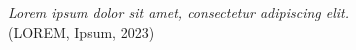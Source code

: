 
\renewcommand{\epigraphname}{EPÍGRAFE}

\begin{epigrafe}

\textit{Lorem ipsum dolor sit amet, consectetur adipiscing elit.}
\\  \hspace*{\fill} (LOREM, Ipsum, 2023)

\end{epigrafe}
